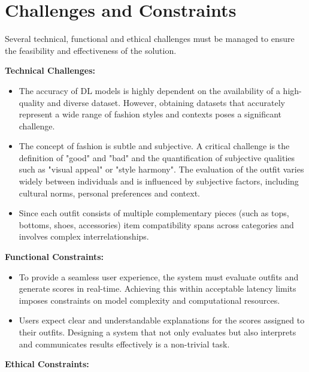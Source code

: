 \section{Challenges and Constraints}

Several technical, functional and ethical challenges must be managed to ensure the feasibility and effectiveness of the solution.

\vspace{0.5cm}

\textbf{Technical Challenges:}

\begin{itemize}
  \item The accuracy of \acs{DL} models is highly dependent on the availability of a high-quality and diverse dataset. However, obtaining datasets that accurately represent a wide range of fashion styles and contexts poses a significant challenge.
  \item The concept of fashion is subtle and subjective. A critical challenge is the definition of "good" and "bad" and the quantification of subjective qualities such as "visual appeal" or "style harmony". The evaluation of the outfit varies widely between individuals and is influenced by subjective factors, including cultural norms, personal preferences and context. \cite[vgl.]{chen_survey_2023}
  \item Since each outfit consists of multiple complementary pieces (such as tops, bottoms, shoes, accessories) item compatibility spans across categories and involves complex interrelationships. \cite[vgl.]{chen_survey_2023}
\end{itemize}

\textbf{Functional Constraints:}

\begin{itemize}
  \item To provide a seamless user experience, the system must evaluate outfits and generate scores in real-time. Achieving this within acceptable latency limits imposes constraints on model complexity and computational resources.
  \item Users expect clear and understandable explanations for the scores assigned to their outfits. Designing a system that not only evaluates but also interprets and communicates results effectively is a non-trivial task.
\end{itemize}

\textbf{Ethical Constraints:}

